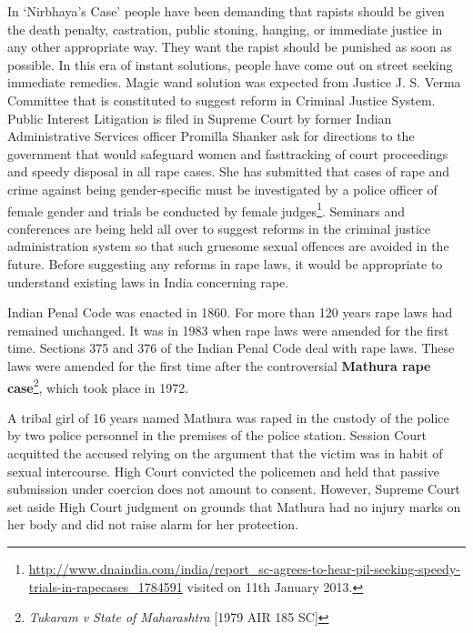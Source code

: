 \begin{multicols}{2}
\vspace{.6cm}


\noi
In ‘Nirbhaya's Case' people have been demanding that rapists should be given the death
penalty, castration, public stoning, hanging, or immediate justice in any other
appropriate way. They want the rapist should be punished as soon as possible. In this era of instant solutions, people have come out on street seeking immediate remedies.
Magic wand solution was expected from Justice J. S. Verma Committee that is
constituted to suggest reform in Criminal Justice System. Public Interest Litigation is
filed in Supreme Court by former Indian Administrative Services officer Promilla
Shanker ask for directions to the government that would safeguard women and fasttracking of court proceedings and speedy disposal in all rape cases. She has submitted
that cases of rape and crime against being gender-specific must be investigated by a
police officer of female gender and trials be conducted by female judges\footnote{\url{http://www.dnaindia.com/india/report_sc-agrees-to-hear-pil-seeking-speedy-trials-in-rapecases_1784591} visited on 11th January 2013.}. Seminars
and conferences are being held all over to suggest reforms in the criminal justice
administration system so that such gruesome sexual offences are avoided in the future.
Before suggesting any reforms in rape laws, it would be appropriate to understand
existing laws in India concerning rape. 


\noi
Indian Penal Code was enacted in 1860. For more than 120 years rape laws had
remained unchanged. It was in 1983 when rape laws were amended for the first time.
Sections 375 and 376 of the Indian Penal Code deal with rape laws. These laws were
amended for the first time after the controversial {\bf Mathura rape case}\footnote{{\it Tukaram v State of Maharashtra} [1979 AIR 185 SC]}, which took place
in 1972.

\newpage

\noi
A tribal girl of 16 years named Mathura was raped in the custody of the police by two
police personnel in the premises of the police station. Session Court acquitted the
accused relying on the argument that the victim was in habit of sexual intercourse. High
Court convicted the policemen and held that passive submission under coercion does
not amount to consent. However, Supreme Court set aside High Court judgment on
grounds that Mathura had no injury marks on her body and did not raise alarm for her
protection.


\end{multicols}
